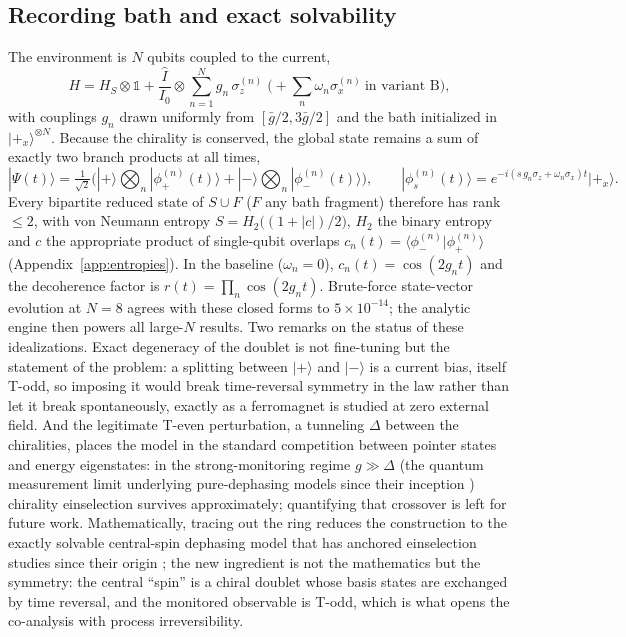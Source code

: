\documentclass[11pt]{article}
\newcommand{\Iop}{\hat{I}}
\begin{document}
\subsection{Recording bath and exact solvability}

The environment is $N$ qubits coupled to the current,
\begin{equation}
H = H_S\otimes\mathbb1 + \frac{\Iop}{I_0}\otimes\sum_{n=1}^{N} g_n\,\sigma_z^{(n)}
\;\Big({+}\sum_n \omega_n\sigma_x^{(n)}\ \text{in variant B}\Big),
\label{eq:H}
\end{equation}
with couplings $g_n$ drawn uniformly from $[\bar g/2,3\bar g/2]$ and the bath initialized in $|+_x\rangle^{\otimes N}$. Because the chirality is conserved, the global state remains a sum of exactly two branch products at all times,
\begin{equation}
|\Psi(t)\rangle = \tfrac{1}{\sqrt2}\Big(|+\rangle\bigotimes_n|\phi^{(n)}_+(t)\rangle
+ |-\rangle\bigotimes_n|\phi^{(n)}_-(t)\rangle\Big),
\qquad
|\phi^{(n)}_s(t)\rangle = e^{-i(s\,g_n\sigma_z+\omega_n\sigma_x)t}|+_x\rangle.
\label{eq:branches}
\end{equation}
Every bipartite reduced state of $S\cup F$ ($F$ any bath fragment) therefore has rank $\le2$, with von Neumann entropy $S = H_2\!\big((1{+}|c|)/2\big)$, $H_2$ the binary entropy and $c$ the appropriate product of single-qubit overlaps $c_n(t)=\langle\phi^{(n)}_-|\phi^{(n)}_+\rangle$ (Appendix~\ref{app:entropies}). In the baseline ($\omega_n=0$), $c_n(t)=\cos(2g_nt)$ and the decoherence factor is $r(t)=\prod_n\cos(2g_nt)$. Brute-force state-vector evolution at $N=8$ agrees with these closed forms to $5\times10^{-14}$; the analytic engine then powers all large-$N$ results. Two remarks on the status of these idealizations. Exact degeneracy of the doublet is not fine-tuning but the statement of the problem: a splitting between $|+\rangle$ and $|-\rangle$ is a current bias, itself T-odd, so imposing it would break time-reversal symmetry in the law rather than let it break spontaneously, exactly as a ferromagnet is studied at zero external field. And the legitimate T-even perturbation, a tunneling $\Delta$ between the chiralities, places the model in the standard competition between pointer states and energy eigenstates: in the strong-monitoring regime $g\gg\Delta$ (the quantum measurement limit underlying pure-dephasing models since their inception \cite{Zurek2003}) chirality einselection survives approximately; quantifying that crossover is left for future work. Mathematically, tracing out the ring reduces the construction to the exactly solvable central-spin dephasing model that has anchored einselection studies since their origin \cite{Zurek1981,Riedel2012}; the new ingredient is not the mathematics but the symmetry: the central ``spin'' is a chiral doublet whose basis states are exchanged by time reversal, and the monitored observable is T-odd, which is what opens the co-analysis with process irreversibility.
\end{document}
